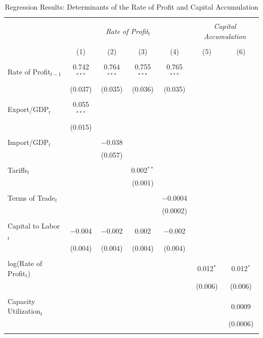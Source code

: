 \documentclass[10pt]{article}
\begin{document}
\begin{table}[!htbp]
  \small
  \centering
  \caption{Regression Results: Determinants of the Rate of Profit and Capital Accumulation}
  \label{table:rop_regression_results}
  \begin{tabular}{@{\extracolsep{4pt}}lcccccc}
    \\[-1.5ex]\hline
    \hline \\[-1.5ex]
    & \multicolumn{4}{c}{\textit{Rate of Profit$_{t}$}} & \multicolumn{2}{c}{\textit{Capital Accumulation}} \\
    \\[-1.5ex] & (1) & (2) & (3) & (4) & (5) & (6) \\
    \hline \\[-1.5ex]
    Rate of Profit$_{t-1}$ & 0.742$^{***}$ & 0.764$^{***}$ & 0.755$^{***}$ & 0.765$^{***}$ & & \\
    & (0.037) & (0.035) & (0.036) & (0.035) & & \\
    \\
    Export/GDP$_{t}$ & 0.055$^{***}$ &  &  &  & & \\
    & (0.015) &  &  &  & & \\
    \\
    Import/GDP$_{t}$ &  & $-$0.038 &  &  & & \\
    &  & (0.057) &  &  & & \\
    \\
    Tariffs$_{t}$ &  &  & 0.002$^{**}$ &  & & \\
    &  &  & (0.001) &  & & \\
    \\
    Terms of Trade$_{t}$ &  &  &  & $-$0.0004 & & \\
    &  &  &  & (0.0002) & & \\
    \\
    Capital to Labor$_{t}$ & $-$0.004 & $-$0.002 & 0.002 & $-$0.002 & & \\
    & (0.004) & (0.004) & (0.004) & (0.004) & & \\
    \\
    log(Rate of Profit$_{t}$) &  &  &  &  & 0.012$^{*}$ & 0.012$^{*}$ \\
    &  &  &  &  & (0.006) & (0.006) \\
    \\
    Capacity Utilization$_{t}$ &  &  &  &  & & 0.0009 \\
    &  &  &  &  & & (0.0006) \\
    \hline \\[-1.5ex]

\end{tabular}
\end{table}
\end{document}
